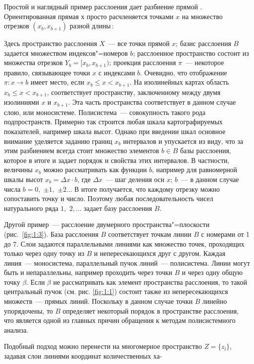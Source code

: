 \documentclass[draft,openany,14pt]{extbook}
\begin{document}
Простой и наглядный пример расслоения дает разбиение прямой \cite{b136}. Ориентированная прямая х просто расчленяется точками $x$ на множество отрезков $(x_b, x_{b+1})$ разной длины\,:


\noindent{}Здесь пространство расслоения $X$~--- все точки прямой $x$; базис расслоения $B$ задается множеством индексов"=номеров $b$; расслоенное пространство состоит из множества отрезков $Y_b = [x_b, x_{b+1})$; проекция расслоения $\pi{}$~--- некоторое правило, связывающее точки $x$ с индексами $b$. Очевидно, что отображение $\pi{}: x\to{} b$ имеет место, если $x_b \leqslant{} x < x_{b+1}$. На изолинейных картах область $x_b \leqslant{} x < x_{b+1}$, соответствует пространству, заключенному между двумя изолиниями $x$ и $x_{b+1}$. Эта часть пространства соответствует в данном случае слою, или моносистеме. Полисистема~--- совокупность такого рода подпространств. Примерно так строится любая шкала картографируемых показателей, например шкала высот. Однако при введении шкал основное внимание уделяется заданию границ $x_b$ интервалов и упускается из виду, что за этим разбиением всегда стоит множество элементов $b\in{}B$ базы расслоения, которое в итоге и задает порядок и свойства этих интервалов. В частности, величины $x_b$ можно рассматривать как функции $b$, например для равномерной шкалы высот $x_b=\Delta{}x\cdot{} b$, где $\Delta{}x$~--- шаг деления оси $x$; $b$~--- в данном случае числа $b=0,$ $\pm{}1,$ $\pm{}2\ldots{}$ В итоге получается, что каждому отрезку можно сопоставить точку и число. Поэтому любая последовательность чисел натурального ряда $1,$ $2,\ldots{}$ задает базу расслоения $B$.



Другой пример~--- расслоение двумерного пространства"=плоскости (рис.~\ref{fig:1:3}). База расслоения $B$ соответствует точкам линии $B$ с номерами от 1 до 7. Слои задаются параллельными линиями как множество точек, проходящих только через одну точку из $B$ и непересекающихся друг с другом. Каждая линия~--- моносистема, параллельный пучок линий~--- полисистема. Линии могут быть и непараллельны, например проходить через точки $B$ и через одну общую точку $\beta$. Если $\beta{}$ не рассматривать как элемент пространства расслоения, то такой центральный пучок (см. рис. \ref{fig:1:1}) состоит также из непересекающихся множеств~--- прямых линий. Поскольку в данном случае точки $B$ линейно упорядочены, то $B$ определяет некоторый порядок в пространстве расслоения, что является одной из главных причин обращения к методам полисистемного анализа.

Подобный подход можно перенести на многомерное пространство $Z=\{z_l\}$, задавая слои линиями координат количественных ха-

\end{document}

